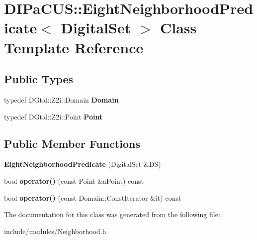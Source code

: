 \hypertarget{classDIPaCUS_1_1EightNeighborhoodPredicate}{}\section{D\+I\+Pa\+C\+US\+:\+:Eight\+Neighborhood\+Predicate$<$ Digital\+Set $>$ Class Template Reference}
\label{classDIPaCUS_1_1EightNeighborhoodPredicate}
\subsection*{Public Types}
\begin{DoxyCompactItemize}
\item 
\mbox{\label{classDIPaCUS_1_1EightNeighborhoodPredicate_a3bb148c016b0f7232d91ac4668209b81}} 
typedef D\+Gtal\+::\+Z2i\+::\+Domain {\bfseries Domain}
\item 
\mbox{\label{classDIPaCUS_1_1EightNeighborhoodPredicate_a9ca3778f568cc5a0da546fc3a64ac72d}} 
typedef D\+Gtal\+::\+Z2i\+::\+Point {\bfseries Point}
\end{DoxyCompactItemize}
\subsection*{Public Member Functions}
\begin{DoxyCompactItemize}
\item 
\mbox{\label{classDIPaCUS_1_1EightNeighborhoodPredicate_a92a09a3f9ae3b9091089d9eb8cac6229}} 
{\bfseries Eight\+Neighborhood\+Predicate} (Digital\+Set \&DS)
\item 
\mbox{\label{classDIPaCUS_1_1EightNeighborhoodPredicate_a3c2c142c035a5171b2881a51f3b85c9d}} 
bool {\bfseries operator()} (const Point \&a\+Point) const
\item 
\mbox{\label{classDIPaCUS_1_1EightNeighborhoodPredicate_a85177a19f47c1005036f81d34f71a67f}} 
bool {\bfseries operator()} (const Domain\+::\+Const\+Iterator \&it) const
\end{DoxyCompactItemize}


The documentation for this class was generated from the following file\+:\begin{DoxyCompactItemize}
\item 
include/modules/Neighborhood.\+h\end{DoxyCompactItemize}

